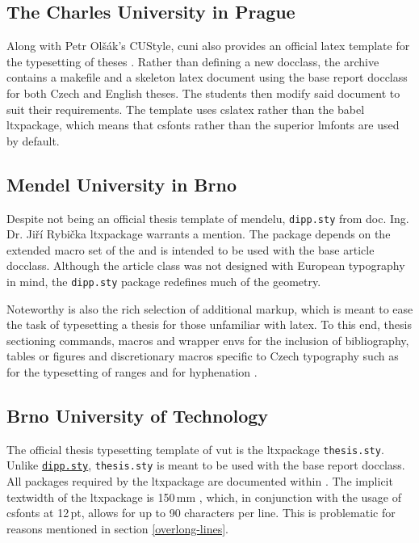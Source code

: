   \subsection{The Charles University in Prague}
  Along with Petr Olšák's CUStyle, \gls{cuni} also provides an official \gls{latex} template for the typesetting of theses \cite{cunisablona}. Rather than defining a new \gls{docclass}, the archive contains a \gls{makefile} and a skeleton \gls{latex} document using the base report \gls{docclass} for both Czech and English theses. The students then modify said document to suit their requirements. The template uses \gls{cslatex} rather than the babel \gls{ltxpackage}, which means that \gls{csfonts} rather than the superior \gls{lmfonts} \cite{cslatexvsbabel} are used by default.

  \subsection{Mendel University in Brno}\label{sec:dipp.sty}
  Despite not being an official thesis template of \gls{mendelu}, \texttt{dipp.sty} from doc. Ing. Dr. Jiří Rybička \gls{ltxpackage} warrants a mention. The package depends on the extended macro set of the   and is intended to be used with the base article \gls{docclass}. Although the article class was not designed with European typography in mind, the \texttt{dipp.sty} package redefines much of the geometry.

  Noteworthy is also the rich selection of additional markup, which is meant to ease the task of typesetting a thesis for those unfamiliar with \gls{latex}. To this end, thesis sectioning commands, macros and wrapper \glspl{env} for the inclusion of bibliography, tables or figures and discretionary macros specific to Czech typography such as  for the typesetting of ranges and  for hyphenation \cite{dippman}.

  \subsection{Brno University of Technology}
  The official thesis typesetting template of \gls{vut} is the \gls{ltxpackage} \texttt{thesis.sty}. Unlike \texttt{\hyperref[sec:dipp.sty]{\tt dipp.sty}}, \texttt{thesis.sty} is meant to be used with the base report \gls{docclass}. All packages required by the \gls{ltxpackage} are documented within \cite[p.~9]{thesis.sty-doc}\pending{}. The implicit \gls{textwidth} of the \gls{ltxpackage} is 150\,mm \cite[p.~2]{thesis.sty-doc}, which, in conjunction with the usage of \gls{csfonts} at 12\,pt, allows for up to 90 characters per line. This is problematic for reasons mentioned in section \ref{overlong-lines}.
  
